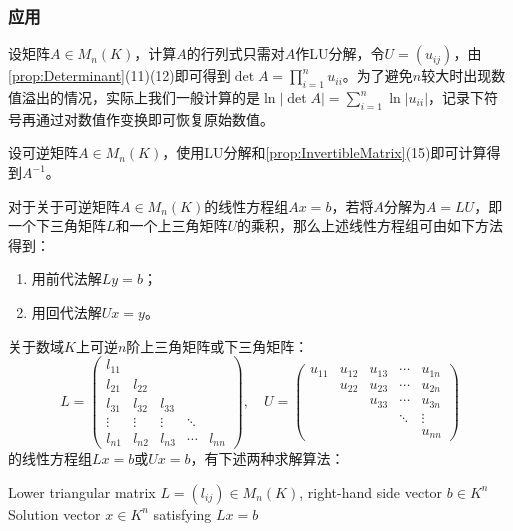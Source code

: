 \subsubsection{应用}
\begin{method}
	设矩阵$A\in M_{n}(K)$，计算$A$的行列式只需对$A$作LU分解，令$U=(u_{ij})$，由\cref{prop:Determinant}(11)(12)即可得到$\det A=\prod\limits_{i=1}^{n}u_{ii}$。为了避免$n$较大时出现数值溢出的情况，实际上我们一般计算的是$\ln|\det A|=\sum\limits_{i=1}^{n}\ln|u_{ii}|$，记录下符号再通过对数值作变换即可恢复原始数值。
\end{method}
\begin{method}
	设可逆矩阵$A\in M_{n}(K)$，使用LU分解和\cref{prop:InvertibleMatrix}(15)即可计算得到$A^{-1}$。
\end{method}
\begin{method}
	对于关于可逆矩阵$A\in M_{n}(K)$的线性方程组$Ax=b$，若将$A$分解为$A=LU$，即一个下三角矩阵$L$和一个上三角矩阵$U$的乘积，那么上述线性方程组可由如下方法得到：
	\begin{enumerate}
		\item 用前代法解$Ly=b$；
		\item 用回代法解$Ux=y$。
	\end{enumerate}\par
	关于数域$K$上可逆$n$阶上三角矩阵或下三角矩阵：
	\begin{equation*}
		L=
		\begin{pmatrix}
			l_{11} & & & &  \\
			l_{21} & l_{22} & & &  \\
			l_{31} & l_{32} & l_{33} & &  \\
			\vdots & \vdots & \vdots & \ddots &  \\
			l_{n1} & l_{n2} & l_{n3} & \cdots & l_{nn}
		\end{pmatrix},\quad
		U=
		\begin{pmatrix}
			u_{11} & u_{12} & u_{13} & \cdots & u_{1n} \\
			& u_{22} & u_{23} & \cdots & u_{2n} \\
			&       & u_{33} & \cdots & u_{3n} \\
			&  &  & \ddots & \vdots \\
			&       &       &  & u_{nn}
		\end{pmatrix}
	\end{equation*}
	的线性方程组$Lx=b$或$Ux=b$，有下述两种求解算法：
	\begin{algorithm}[H]
		\caption{Forward Substitution for Lower Triangular Systems}
		\label{alg:ForwardSubstitution}
		\begin{algorithmic}[1]
			\Require Lower triangular matrix $L=(l_{ij})\in M_{n}(K)$, right-hand side vector $b\in K^n$
			\Ensure Solution vector $x\in K^n$ satisfying $Lx=b$
			

\end{algorithmic}
\end{algorithm}
\end{method}
